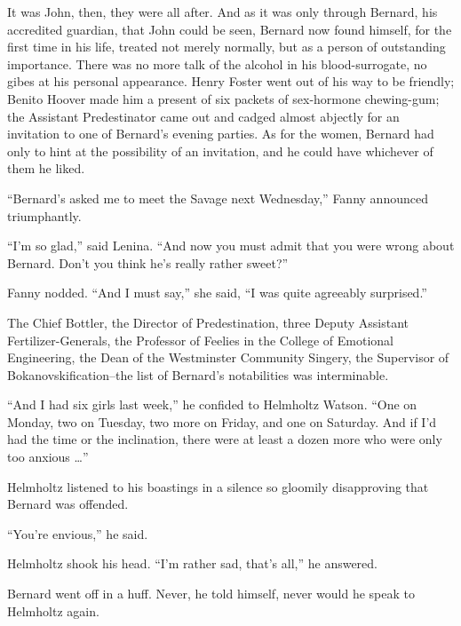 \documentclass[12pt]{report}
\begin{document}
It was John, then, they were all after. And as it was only through
Bernard, his accredited guardian, that John could be seen, Bernard now
found himself, for the first time in his life, treated not merely
normally, but as a person of outstanding importance. There was no more
talk of the alcohol in his blood-surrogate, no gibes at his personal
appearance. Henry Foster went out of his way to be friendly; Benito
Hoover made him a present of six packets of sex-hormone chewing-gum; the
Assistant Predestinator came out and cadged almost abjectly for an
invitation to one of Bernard's evening parties. As for the women,
Bernard had only to hint at the possibility of an invitation, and he
could have whichever of them he liked.

``Bernard's asked me to meet the Savage next Wednesday,'' Fanny
announced triumphantly.

``I'm so glad,'' said Lenina. ``And now you must admit that you were
wrong about Bernard. Don't you think he's really rather sweet?''

Fanny nodded. ``And I must say,'' she said, ``I was quite agreeably
surprised.''

The Chief Bottler, the Director of Predestination, three Deputy
Assistant Fertilizer-Generals, the Professor of Feelies in the College
of Emotional Engineering, the Dean of the Westminster Community Singery,
the Supervisor of Bokanovskification--the list of Bernard's notabilities
was interminable.

``And I had six girls last week,'' he confided to Helmholtz Watson.
``One on Monday, two on Tuesday, two more on Friday, and one on
Saturday. And if I'd had the time or the inclination, there were at
least a dozen more who were only too anxious \ldots{}''

Helmholtz listened to his boastings in a silence so gloomily
disapproving that Bernard was offended.

``You're envious,'' he said.

Helmholtz shook his head. ``I'm rather sad, that's all,'' he answered.

Bernard went off in a huff. Never, he told himself, never would he speak
to Helmholtz again.
\end{document}
